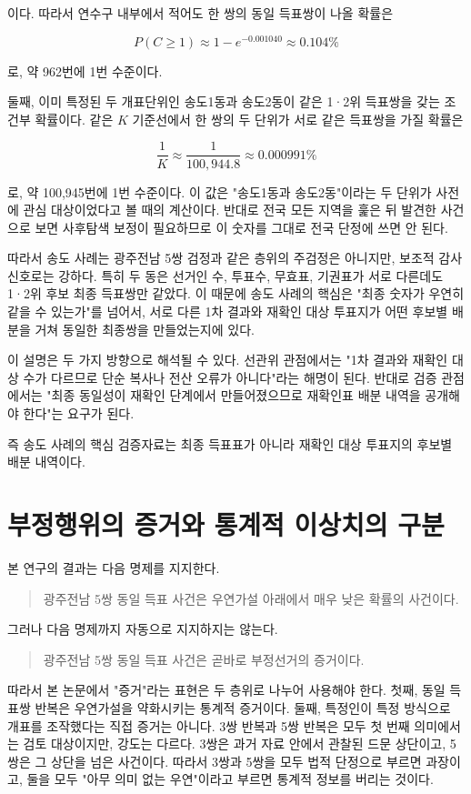 \documentclass[preprint]{IEIE}
\begin{document}
이다. 따라서 연수구 내부에서 적어도 한 쌍의 동일 득표쌍이 나올 확률은

\[
P(C \ge 1) \approx 1-e^{-0.001040} \approx 0.104\%
\]

로, 약 962번에 1번 수준이다.

둘째, 이미 특정된 두 개표단위인 송도1동과 송도2동이 같은 1·2위 득표쌍을 갖는 조건부 확률이다. 같은 \(K\) 기준선에서 한 쌍의 두 단위가 서로 같은 득표쌍을 가질 확률은

\[
\frac{1}{K} \approx \frac{1}{100,944.8} \approx 0.000991\%
\]

로, 약 100,945번에 1번 수준이다. 이 값은 "송도1동과 송도2동"이라는 두 단위가 사전에 관심 대상이었다고 볼 때의 계산이다. 반대로 전국 모든 지역을 훑은 뒤 발견한 사건으로 보면 사후탐색 보정이 필요하므로 이 숫자를 그대로 전국 단정에 쓰면 안 된다.

따라서 송도 사례는 광주전남 5쌍 검정과 같은 층위의 주검정은 아니지만, 보조적 감사 신호로는 강하다. 특히 두 동은 선거인 수, 투표수, 무효표, 기권표가 서로 다른데도 1·2위 후보 최종 득표쌍만 같았다. 이 때문에 송도 사례의 핵심은 "최종 숫자가 우연히 같을 수 있는가"를 넘어서, 서로 다른 1차 결과와 재확인 대상 투표지가 어떤 후보별 배분을 거쳐 동일한 최종쌍을 만들었는지에 있다.

이 설명은 두 가지 방향으로 해석될 수 있다. 선관위 관점에서는 "1차 결과와 재확인 대상 수가 다르므로 단순 복사나 전산 오류가 아니다"라는 해명이 된다. 반대로 검증 관점에서는 "최종 동일성이 재확인 단계에서 만들어졌으므로 재확인표 배분 내역을 공개해야 한다"는 요구가 된다.

즉 송도 사례의 핵심 검증자료는 최종 득표표가 아니라 재확인 대상 투표지의 후보별 배분 내역이다.

\section{부정행위의 증거와 통계적 이상치의 구분}

본 연구의 결과는 다음 명제를 지지한다.

\begin{quote}
광주전남 5쌍 동일 득표 사건은 우연가설 아래에서 매우 낮은 확률의 사건이다.
\end{quote}

그러나 다음 명제까지 자동으로 지지하지는 않는다.

\begin{quote}
광주전남 5쌍 동일 득표 사건은 곧바로 부정선거의 증거이다.
\end{quote}

따라서 본 논문에서 "증거"라는 표현은 두 층위로 나누어 사용해야 한다. 첫째, 동일 득표쌍 반복은 우연가설을 약화시키는 통계적 증거이다. 둘째, 특정인이 특정 방식으로 개표를 조작했다는 직접 증거는 아니다. 3쌍 반복과 5쌍 반복은 모두 첫 번째 의미에서는 검토 대상이지만, 강도는 다르다. 3쌍은 과거 자료 안에서 관찰된 드문 상단이고, 5쌍은 그 상단을 넘은 사건이다. 따라서 3쌍과 5쌍을 모두 법적 단정으로 부르면 과장이고, 둘을 모두 "아무 의미 없는 우연"이라고 부르면 통계적 정보를 버리는 것이다.
\end{document}
